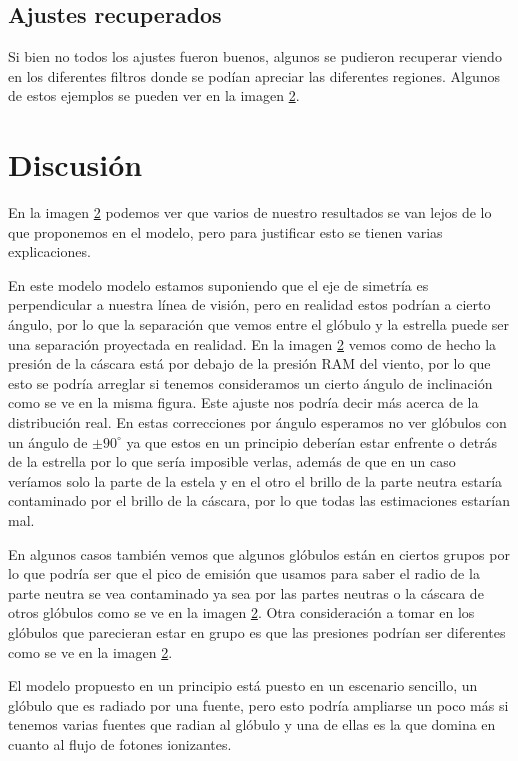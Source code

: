 \documentclass{book}
\begin{document}
\section{Ajustes recuperados}

Si bien no todos los ajustes fueron buenos, algunos se pudieron recuperar viendo en los diferentes filtros donde se podían apreciar las diferentes regiones. Algunos de estos ejemplos se pueden ver en la imagen \ref{}.

\chapter{Discusión}

En la imagen \ref{} podemos ver que varios de nuestro resultados se van lejos de lo que proponemos en el modelo, pero para justificar esto se tienen varias explicaciones. 

En este modelo modelo estamos suponiendo que el eje de simetría es perpendicular a nuestra línea de visión, pero en realidad estos podrían a cierto ángulo, por lo que la separación que vemos entre el glóbulo y la estrella puede ser una separación proyectada en realidad. En la imagen \ref{} vemos como de hecho la presión de la cáscara está por debajo de la presión RAM del viento, por lo que esto se podría arreglar si tenemos consideramos un cierto ángulo de inclinación como se ve en la misma figura. Este ajuste nos podría decir más acerca de la distribución real. En estas correcciones por ángulo esperamos no ver glóbulos con un ángulo de $\pm 90^\circ$ ya que estos en un principio deberían estar enfrente o detrás de la estrella por lo que sería imposible verlas, además de que en un caso veríamos solo la parte de la estela y en el otro el brillo de la parte neutra estaría contaminado por el brillo de la cáscara, por lo que todas las estimaciones estarían mal.

En algunos casos también vemos que algunos glóbulos están en ciertos grupos por lo que podría ser que el pico de emisión que usamos para saber el radio de la parte neutra se vea contaminado ya sea por las partes neutras o la cáscara de otros glóbulos como se ve en la imagen \ref{}. Otra consideración a tomar en los glóbulos que parecieran estar en grupo es que las presiones podrían ser diferentes como se ve en la imagen \ref{}.

El modelo propuesto en un principio está puesto en un escenario sencillo, un glóbulo que es radiado por una fuente, pero esto podría ampliarse un poco más si tenemos varias fuentes que radian al glóbulo y una de ellas es la que domina en cuanto al flujo de fotones ionizantes.
\end{document}
